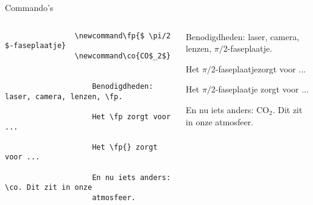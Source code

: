 
\begin{frame}[fragile]{Commando's}
    \begin{columns}
        \begin{column}{0.5\textwidth}
            \begin{verbatim}
                \newcommand\fp{$ \pi/2 $-faseplaatje}
                \newcommand\co{CO$_2$}
        
                
                    Benodigdheden: laser, camera, lenzen, \fp.

                    Het \fp zorgt voor ...

                    Het \fp{} zorgt voor ...
        
                    En nu iets anders: \co. Dit zit in onze
                    atmosfeer.
                
            \end{verbatim}
        \end{column}
        \begin{column}{0.5\textwidth}
            \begin{demobox}\small\setlength\parskip{5pt}
                \def\fp{$ \pi/2 $-faseplaatje}
                \def\co{CO$_2$}
    
                Benodigdheden: laser, camera, lenzen, \fp.

                Het \fp zorgt voor ...

                Het \fp{} zorgt voor ...
    
                En nu iets anders: \co. Dit zit in onze
                atmosfeer.
            \end{demobox}
        \end{column}
    \end{columns}
\end{frame}

\let\exampleTerm\somethingundefined
\newcommand\exampleTerm[1]{\textcolor{blue}{\textit{#1}}}

